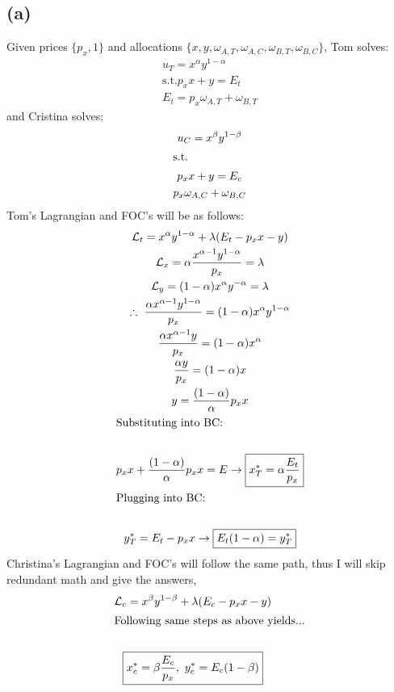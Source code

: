 \documentclass[10pt,a4paper]{article}
\begin{document}
  \subsection*{(a)}
    Given prices $\{p_x, 1\}$ and allocations $\{x,y,\omega_{A,T}, \omega_{A,C}, \omega_{B, T}, \omega_{B,C}\}$, 
    Tom solves:
    \begin{gather*}
        u_T = x^{\alpha}y^{1-\alpha} \\
        \text{s.t.}
        p_xx + y = E_t \\
        E_t = p_x\omega_{A,T} + \omega_{B,T}
    \end{gather*}
    and Cristina solves:
    \begin{gather*}
        u_C = x^{\beta}y^{1-\beta} \\
        \shortintertext{s.t.}
        p_xx + y = E_c \\
        p_x\omega_{A,C} + \omega_{B,C}
    \end{gather*}
    Tom's Lagrangian and FOC's will be as follows:
    \begin{gather*}
      \mathcal{L}_t = x^{\alpha}y^{1-\alpha} + \lambda(E_t-p_xx - y) \\
      \mathcal{L}_x = \alpha\frac{x^{\alpha-1}y^{1-\alpha}}{p_x} = \lambda \\
      \mathcal{L}_y = (1-\alpha)x^{\alpha}y^{-\alpha} = \lambda \\
      \therefore \ \frac{\alpha x^{\alpha-1}y^{1-\alpha}}{p_x} = (1-\alpha)x^{\alpha}y^{1-\alpha} \\
      \frac{\alpha x^{\alpha-1}y}{p_x} = (1-\alpha)x^{\alpha} \\
      \frac{\alpha y}{p_x} = (1-\alpha)x \\
      y = \frac{(1-\alpha)}{\alpha}p_xx \\
      \shortintertext{Substituting into BC:} \\
      p_xx + \frac{(1-\alpha)}{\alpha}p_xx = E \rightarrow \boxed{x^*_T = \alpha\frac{E_t}{p_x}} \\
      \shortintertext{Plugging into BC:} \\
      y_T^* = E_t - p_xx \rightarrow \boxed{E_t(1-\alpha) = y_T^*}
    \end{gather*}
    Christina's Lagrangian and FOC's will follow the same path, thus I will skip redundant math and give the answers,
    \begin{gather*}
      \mathcal{L}_c = x^{\beta}y^{1-\beta} + \lambda(E_c - p_xx - y) \\
      \shortintertext{Following same steps as above yields...} \\
      \boxed{x^*_c = \beta\frac{E_c}{p_x}, \ y^*_c = E_c(1-\beta)} \\
    \end{gather*}
\end{document}
